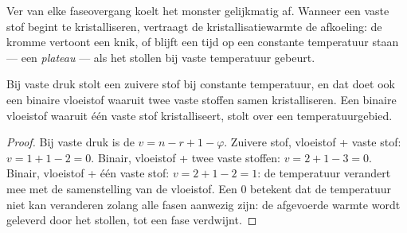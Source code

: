 Ver van elke faseovergang koelt het monster gelijkmatig af. Wanneer een vaste stof begint te
kristalliseren, vertraagt de kristallisatiewarmte de afkoeling: de kromme vertoont een
knik, of blijft een tijd op een constante temperatuur staan --- een
\textit{plateau} --- als het stollen bij vaste temperatuur gebeurt.

\begin{proposition}[Plateaus]\label{prop:b2:solid-liquid-diagrams:plateaus}
Bij vaste druk stolt een zuivere stof bij constante temperatuur, en dat
doet ook een binaire vloeistof waaruit twee vaste stoffen samen kristalliseren. Een binaire
vloeistof waaruit één vaste stof kristalliseert, stolt over een temperatuurgebied.
\end{proposition}

\begin{proof}
Bij vaste druk is de  $v = n - r + 1 - \varphi$. Zuivere
stof, vloeistof + vaste stof: $v = 1 + 1 - 2 = 0$. Binair, vloeistof + twee vaste stoffen:
$v = 2 + 1 - 3 = 0$. Binair, vloeistof + één vaste stof: $v = 2 + 1 - 2 = 1$: de
temperatuur verandert mee met de samenstelling van de vloeistof. Een  0 betekent dat de
temperatuur niet kan veranderen zolang alle fasen aanwezig zijn: de afgevoerde warmte wordt
geleverd door het stollen, tot een fase verdwijnt.
\end{proof}

